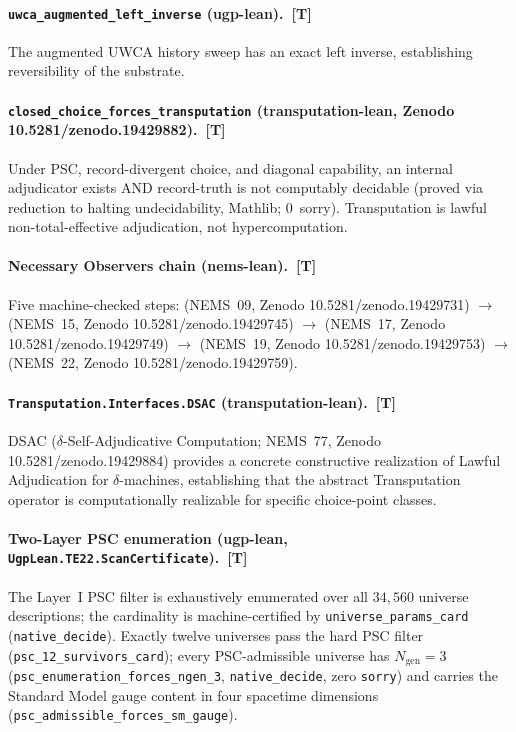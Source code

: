 \documentclass[12pt]{article}
\begin{document}
\paragraph{\texttt{uwca\_augmented\_left\_inverse} (ugp-lean).~[\textbf{T}]}
The augmented UWCA history sweep has an exact left inverse, establishing
reversibility of the substrate.

\paragraph{\texttt{closed\_choice\_forces\_transputation} (transputation-lean,
Zenodo 10.5281/\allowbreak zenodo.19429882).~[\textbf{T}]}
Under PSC, record-divergent choice, and diagonal capability, an internal
adjudicator exists AND record-truth is not computably decidable
(proved via reduction to halting undecidability, Mathlib; 0~sorry).
Transputation is lawful non-total-effective adjudication, not hypercomputation.

\paragraph{Necessary Observers chain (nems-lean).~[\textbf{T}]}
\begin{sloppypar}
Five machine-checked steps:
 (NEMS~09,
Zenodo 10.5281/\allowbreak zenodo.19429731) $\to$
 (NEMS~15,
Zenodo 10.5281/\allowbreak zenodo.19429745) $\to$
 (NEMS~17,
Zenodo 10.5281/\allowbreak zenodo.19429749) $\to$
 (NEMS~19,
Zenodo 10.5281/\allowbreak zenodo.19429753) $\to$
 (NEMS~22,
Zenodo 10.5281/\allowbreak zenodo.19429759).
\end{sloppypar}

\paragraph{\texttt{Transputation.Interfaces.DSAC} (transputation-lean).~[\textbf{T}]}
DSAC ($\delta$-Self-Adjudicative Computation; NEMS~77,
Zenodo 10.5281/\allowbreak zenodo.19429884) provides a concrete
constructive realization of Lawful Adjudication for $\delta$-machines,
establishing that the abstract Transputation operator is computationally
realizable for specific choice-point classes.

\paragraph{Two-Layer PSC enumeration (ugp-lean,
\texttt{UgpLean.TE22.ScanCertificate}).~[\textbf{T}]}
The Layer~I PSC filter is exhaustively enumerated over all
$34{,}560$ universe descriptions; the cardinality is machine-certified by
\texttt{universe\_params\_card} (\texttt{native\_decide}).
Exactly twelve universes pass the hard PSC filter
(\texttt{psc\_12\_survivors\_card}); every PSC-admissible universe has
$N_{\mathrm{gen}} = 3$
(\texttt{psc\_enumeration\_forces\_ngen\_3}, \texttt{native\_decide}, zero
\texttt{sorry}) and carries the Standard Model gauge content in four
spacetime dimensions (\texttt{psc\_admissible\_forces\_sm\_gauge}).



\end{document}
